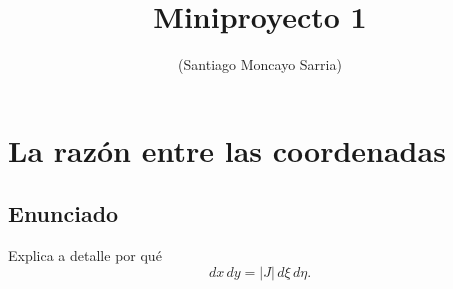 \documentclass[a4paper,11pt]{article}
\title{Miniproyecto 1}
\author{(Santiago Moncayo Sarria)}
\date{}
\begin{document}
\maketitle
\section{La razón entre las coordenadas}

\subsection*{Enunciado}
Explica a detalle por qué
\[
dx\,dy=|J|\,d\xi\,d\eta.
\]
\end{document}
